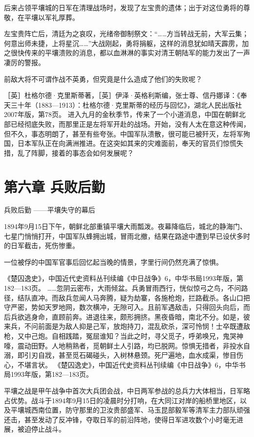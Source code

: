 \documentclass[12pt,UTF8]{ctexbook}
\begin{document}
后来占领平壤城的日军在清理战场时，发现了左宝贵的遗体；出于对这位勇将的尊敬，在平壤以军礼厚葬。

左宝贵阵亡后，清廷为之哀叹，光绪帝御制祭文：“……方当转战无前，大军云集；何意出师未捷，上将星沉……”大战刚起，勇将捐躯，这样的消息犹如晴天霹雳，加之很快传来的平壤溃败的消息，都以血淋淋的事实对清王朝陆军的能力发出了一声凄厉的警报。

前敌大将不可谓作战不英勇，但究竟是什么造成了他们的失败呢？

［英］杜格尔德·克里斯蒂著，［英］伊泽·英格利斯编，张士尊、信丹娜译：《奉天三十年（1883—1913）：杜格尔德·克里斯蒂的经历与回忆》，湖北人民出版社2007年版，第78页。
进入九月的金秋季节，传来了一个小道消息，中国在朝鲜北部已经彻底失败，而那里正是左将军开赴的战场。开始，没有人太在意这种传闻，但不久，事态明朗了，甚至有些夸张。中国军队溃散，很可能已被歼灭，左将军殉国，日本军队正在向满洲推进。在这突如其来的灾难面前，奉天的官员们惊慌失措，乱了阵脚，接着的事态会如何发展呢？ 

\chapter{第六章 兵败后勤}

兵败后勤
——平壤失守的幕后

1894年9月15日下午，朝鲜北部重镇平壤大雨瓢泼。夜幕降临后，城北的静海门、七星门悄悄打开，中国军队蜂拥出城，冒雨北撤，结果在路途中遭到早已设伏多时的日军截击，死伤惨重。

一位被俘的中国军官事后回忆起当晚的情景，字里行间仍然充满了惊惧。

《楚囚逸史》，中国近代史资料丛刊续编《中日战争》6，中华书局1993年版，第182—183页。
……忽阴云密布，大雨倾盆。兵勇冒雨西行，恍似惊弓之鸟，不问路径，结队直冲。而敌兵忽闻人马奔腾，疑为劫寨，各施枪炮，拦路截杀。各山口把守严密，势如天罗地网，数次横冲，无隙可入。且前军遇敌击，只得回头向后，而后兵欲逃身命，直顾前奔。进退往来，颇形拥挤。黑夜昏暗，南北不分。如是，彼来兵，不问前面是为敌人抑是己军，放炮持刀，混乱砍杀，深可怜悯！士卒既遭敌枪，又中己炮。自相践踏，冤屈谁知？当此之时，寻父觅子，呼弟唤兄，鬼哭神嚎，震动田野。人地稍熟者，觅朝鲜土人引路，均已脱网。惊惧无措者，非投水自溺，即引刃自戕，甚至觅石碣碰头，入树林悬颈。死尸遍地，血水成渠，惨目伤心，不堪言状。 《楚囚逸史》，中国近代史资料丛刊续编《中日战争》6，中华书局1993年版，第182—183页。

平壤之战是甲午战争中首次大兵团会战，中日两军参战的总兵力大体相当，日军略占优势。战斗于1894年9月15日的凌晨时分打响，在大同江对岸的船桥里地区，以及平壤城西南位置，防守那里的卫汝贵部盛军、马玉昆部毅军等清军主力部队顽强还击，甚至发动了反冲锋，夺取日军的前沿阵地，使得日军进攻数个小时毫无进展，被迫停止战斗。
\end{document}
